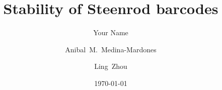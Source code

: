 \documentclass{amsart}
\title{Stability of Steenrod barcodes}
\author[Your short name]{Your Name}
\author[A.~Medina-Mardones]{Anibal~M.~Medina-Mardones}
\author[L.~Zhou]{Ling~Zhou}
\date{\today}
\begin{document}
	
	\maketitle
	
	
	
	
	
	
	\sloppy
	\printbibliography
%	
\end{document}
